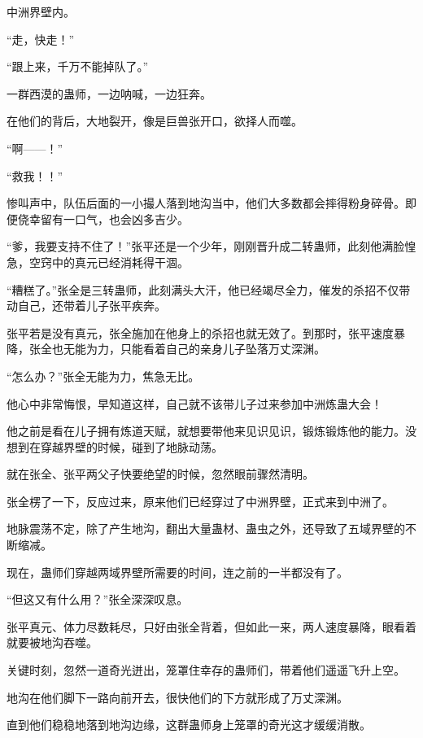 
\begin{this_body}



中洲界壁内。

“走，快走！”

“跟上来，千万不能掉队了。”

一群西漠的蛊师，一边呐喊，一边狂奔。

在他们的背后，大地裂开，像是巨兽张开口，欲择人而噬。

“啊——！”

“救我！！”

惨叫声中，队伍后面的一小撮人落到地沟当中，他们大多数都会摔得粉身碎骨。即便侥幸留有一口气，也会凶多吉少。

“爹，我要支持不住了！”张平还是一个少年，刚刚晋升成二转蛊师，此刻他满脸惶急，空窍中的真元已经消耗得干涸。

“糟糕了。”张全是三转蛊师，此刻满头大汗，他已经竭尽全力，催发的杀招不仅带动自己，还带着儿子张平疾奔。

张平若是没有真元，张全施加在他身上的杀招也就无效了。到那时，张平速度暴降，张全也无能为力，只能看着自己的亲身儿子坠落万丈深渊。

“怎么办？”张全无能为力，焦急无比。

他心中非常悔恨，早知道这样，自己就不该带儿子过来参加中洲炼蛊大会！

他之前是看在儿子拥有炼道天赋，就想要带他来见识见识，锻炼锻炼他的能力。没想到在穿越界壁的时候，碰到了地脉动荡。

就在张全、张平两父子快要绝望的时候，忽然眼前骤然清明。

张全楞了一下，反应过来，原来他们已经穿过了中洲界壁，正式来到中洲了。

地脉震荡不定，除了产生地沟，翻出大量蛊材、蛊虫之外，还导致了五域界壁的不断缩减。

现在，蛊师们穿越两域界壁所需要的时间，连之前的一半都没有了。

“但这又有什么用？”张全深深叹息。

张平真元、体力尽数耗尽，只好由张全背着，但如此一来，两人速度暴降，眼看着就要被地沟吞噬。

关键时刻，忽然一道奇光迸出，笼罩住幸存的蛊师们，带着他们遥遥飞升上空。

地沟在他们脚下一路向前开去，很快他们的下方就形成了万丈深渊。

直到他们稳稳地落到地沟边缘，这群蛊师身上笼罩的奇光这才缓缓消散。


\end{this_body}

